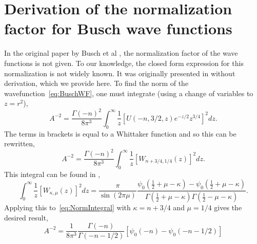 \documentclass[%
 onecolumn,
 notitlepage,
 amsmath,amssymb,
 aps,
]{revtex4-1}
\begin{document}
\section{Derivation of the normalization factor for Busch wave functions}
In the original paper by Busch et al \cite{Busch}, the normalization factor of the wave functions is not given. To our knowledge, the closed form expression for this normalization is not widely known. It was originally presented in \cite{PhysRevA.85.053614} without derivation, which we provide here. To find the norm of the wavefunction~\eqref{eq:BuschWF}, one must integrate (using a change of variables to $z=r^2$),
\begin{equation}\label{eq:NormIntegral}
A^{-2}=\frac{\Gamma(-n)^2}{8\pi^3}  \int_0^\infty \frac{1}{z}\left[U(-n,3/2,z)e^{-z/2} z^{3/4} \right]^2  dz.
\end{equation}
The terms in brackets is equal to a Whittaker function \cite{DLMF} and so this can be rewritten,
\begin{equation}
A^{-2}=\frac{\Gamma(-n)^2}{8\pi^3}  \int_0^\infty \frac{1}{z}\left[W_{n+3/4,1/4}(z) \right]^2  dz.
\end{equation}
This integral can be found in \cite{GradshteynRyzhik},
\begin{equation}
\int_0^\infty \frac{1}{z}\left[W_{\kappa,\mu}(z) \right]^2  dz=\frac{\pi}{\sin (2\pi \mu)}\frac{\psi_0(\frac{1}{2}+\mu-\kappa)-\psi_0(\frac{1}{2}+\mu-\kappa)}{\Gamma(\frac{1}{2}+\mu-\kappa)\Gamma(\frac{1}{2}-\mu-\kappa)}.
\end{equation}
Applying this to~\eqref{eq:NormIntegral} with $\kappa=n+3/4$ and $\mu=1/4$ gives the desired result,
\begin{equation}
A^{-2}=\frac{1}{8\pi^3}  \frac{\Gamma (-n)}{\Gamma(-n-1/2)}\left[\psi_0(-n)-\psi_0(-n-1/2)\right]
\end{equation}
\end{document}
